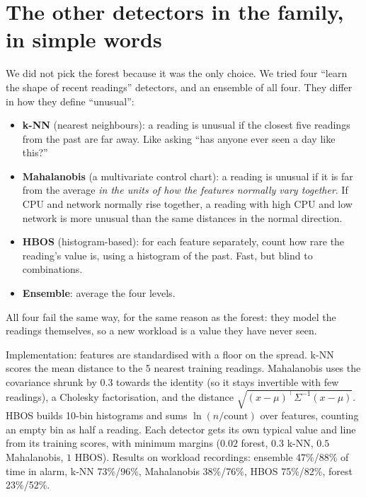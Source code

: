 \section{The other detectors in the family, in simple words}
\begin{simplebox}
We did not pick the forest because it was the only choice. We tried four ``learn the shape of recent readings'' detectors, and an ensemble of all four. They differ in how they define ``unusual'':

\begin{itemize}
\item \textbf{k-NN} (nearest neighbours): a reading is unusual if the closest five readings from the past are far away. Like asking ``has anyone ever seen a day like this?''
\item \textbf{Mahalanobis} (a multivariate control chart): a reading is unusual if it is far from the average \emph{in the units of how the features normally vary together}. If CPU and network normally rise together, a reading with high CPU and low network is more unusual than the same distances in the normal direction.
\item \textbf{HBOS} (histogram-based): for each feature separately, count how rare the reading's value is, using a histogram of the past. Fast, but blind to combinations.
\item \textbf{Ensemble}: average the four levels.
\end{itemize}

All four fail the same way, for the same reason as the forest: they model the readings themselves, so a new workload is a value they have never seen.
\end{simplebox}

\begin{techbox}
Implementation: features are standardised with a floor on the spread. k-NN scores the mean distance to the 5 nearest training readings. Mahalanobis uses the covariance shrunk by $0.3$ towards the identity (so it stays invertible with few readings), a Cholesky factorisation, and the distance $\sqrt{(x-\mu)^\top\Sigma^{-1}(x-\mu)}$. HBOS builds 10-bin histograms and sums $\ln(n/\text{count})$ over features, counting an empty bin as half a reading. Each detector gets its own typical value and line from its training scores, with minimum margins ($0.02$ forest, $0.3$ k-NN, $0.5$ Mahalanobis, $1$ HBOS). Results on workload recordings: ensemble 47\%/88\% of time in alarm, k-NN 73\%/96\%, Mahalanobis 38\%/76\%, HBOS 75\%/82\%, forest 23\%/52\%.
\end{techbox}

